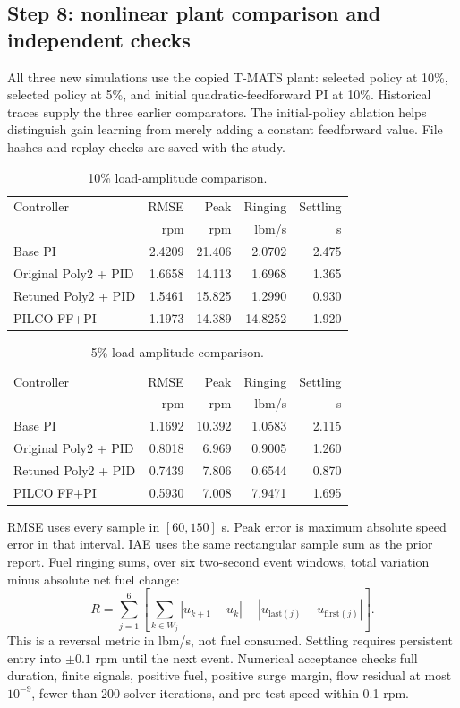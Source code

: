 \subsection{Step 8: nonlinear plant comparison and independent checks}
All three new simulations use the copied T-MATS plant: selected policy at 10\%, selected policy at 5\%, and initial quadratic-feedforward PI at 10\%. Historical traces supply the three earlier comparators. The initial-policy ablation helps distinguish gain learning from merely adding a constant feedforward value. File hashes and replay checks are saved with the study.

\begin{table}[H]\centering\small\begin{tabular}{lrrrr}\toprule Controller & RMSE & Peak & Ringing & Settling\\ & rpm & rpm & lbm/s & s\\\midrule
Base PI & 2.4209 & 21.406 & 2.0702 & 2.475 \\
Original Poly2 + PID & 1.6658 & 14.113 & 1.6968 & 1.365 \\
Retuned Poly2 + PID & 1.5461 & 15.825 & 1.2990 & 0.930 \\
PILCO FF+PI & 1.1973 & 14.389 & 14.8252 & 1.920 \\\bottomrule\end{tabular}\caption{10\% load-amplitude comparison.}\end{table}
\begin{table}[H]\centering\small\begin{tabular}{lrrrr}\toprule Controller & RMSE & Peak & Ringing & Settling\\ & rpm & rpm & lbm/s & s\\\midrule
Base PI & 1.1692 & 10.392 & 1.0583 & 2.115 \\
Original Poly2 + PID & 0.8018 & 6.969 & 0.9005 & 1.260 \\
Retuned Poly2 + PID & 0.7439 & 7.806 & 0.6544 & 0.870 \\
PILCO FF+PI & 0.5930 & 7.008 & 7.9471 & 1.695 \\\bottomrule\end{tabular}\caption{5\% load-amplitude comparison.}\end{table}

RMSE uses every sample in $[60,150]$ s. Peak error is maximum absolute speed error in that interval. IAE uses the same rectangular sample sum as the prior report. Fuel ringing sums, over six two-second event windows, total variation minus absolute net fuel change:
\begin{equation}
 R=\sum_{j=1}^{6}\left[\sum_{k\in W_j}|u_{k+1}-u_k|-|u_{\mathrm{last}(j)}-u_{\mathrm{first}(j)}|\right].
\end{equation}
This is a reversal metric in lbm/s, not fuel consumed. Settling requires persistent entry into $\pm0.1$ rpm until the next event. Numerical acceptance checks full duration, finite signals, positive fuel, positive surge margin, flow residual at most $10^{-9}$, fewer than 200 solver iterations, and pre-test speed within 0.1 rpm.

